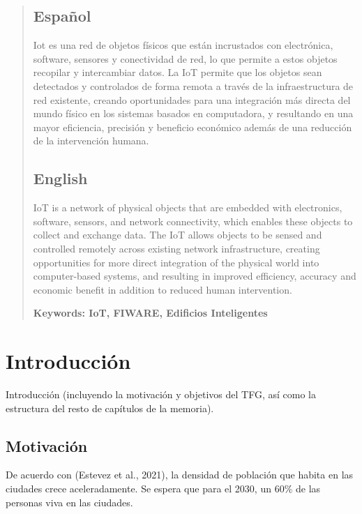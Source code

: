 \documentclass[12pt, a4paper, twoside]{article}
\begin{document}


\newpage

\begin{abstract}

  \subsection{Español}
  Iot es una red de objetos físicos que están incrustados con electrónica, software, 
  sensores y conectividad de red, lo que permite a estos objetos recopilar y intercambiar datos.
  La IoT permite que los objetos sean detectados y controlados de forma remota a través de la 
  infraestructura de red existente, creando oportunidades para una integración más directa del mundo 
  físico en los sistemas basados en computadora, y resultando en una mayor eficiencia, precisión y 
  beneficio económico además de una reducción de la intervención humana.

  \subsection{English}
  IoT is a network of physical objects that are embedded with electronics, 
  software, sensors, and network connectivity, which enables these objects 
  to collect and exchange data. The IoT allows objects to be sensed and controlled 
  remotely across existing network infrastructure, creating opportunities for more 
  direct integration of the physical world into computer-based systems, and resulting 
  in improved efficiency, accuracy and economic benefit in addition to reduced human 
  intervention.

	\bfseries{\large{Keywords:}} IoT, FIWARE, Edificios Inteligentes
\end{abstract}

\tableofcontents

\section{Introducción}
Introducción (incluyendo la motivación y objetivos del TFG, así como la estructura del resto de capítulos de la memoria).

\subsection{Motivación}
De acuerdo con (Estevez et al., 2021), la densidad de población que habita en las ciudades crece aceleradamente.
Se espera que para el 2030, un 60\% de las personas viva en las ciudades. 
\end{document}
